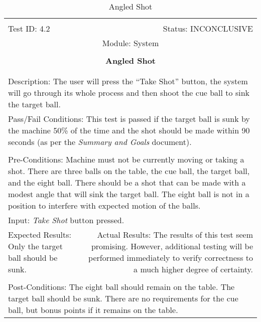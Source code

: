 \documentclass[titlepage]{article}
\begin{document}
\begin{center}
\begin{table}[h!]
\begin{tabular}{|l r|}\hline&\\[-2mm]
	Test ID: 4.2	&Status: INCONCLUSIVE\\[-3mm]
	\multicolumn{2}{|c|}{Module: System}\\&\\
	\multicolumn{2}{|c|}{\textbf{\large{Angled Shot}}}\\&\\\hline&\\[-3mm]
	\multicolumn{2}{|p{\textwidth}|}{Description: The user will press the ``Take Shot'' button, the system will go through its whole process and then shoot the cue ball to sink the target ball.}\\\hline
	\multicolumn{2}{|p{\textwidth}|}{Pass/Fail Conditions: This test is passed if the target ball is sunk by the machine 50\% of the time and the shot should be made within 90 seconds (as per the \textit{Summary and Goals} document).}\\[1mm]\hline&\\[-3mm]
	\multicolumn{2}{|p{\textwidth}|}{Pre-Conditions: Machine must not be currently moving or taking a shot. There are three balls on the table, the cue ball, the target ball, and the eight ball. There should be a shot that can be made with a modest angle that will sink the target ball. The eight ball is not in a position to interfere with expected motion of the balls.}\\[4mm]
	\multicolumn{2}{|p{\textwidth}|}{Input: \textit{Take Shot} button pressed.}\\[2mm]\hline
	\multicolumn{1}{|p{0.49\textwidth}}{Expected Results: Only the target ball should be sunk.}	&\multicolumn{1}{|p{0.45\textwidth}|}{Actual Results: The results of this test seem promising. However, additional testing will be performed immediately to verify correctness to a much higher degree of certainty.}\\\hline&\\[-3mm]
	\multicolumn{2}{|p{\textwidth}|}{Post-Conditions: The eight ball should remain on the table. The target ball should be sunk. There are no requirements for the cue ball, but bonus points if it remains on the table.}\\\hline
\end{tabular}
\caption{Angled Shot}
\end{table}
\end{center}
\newpage
\end{document}
